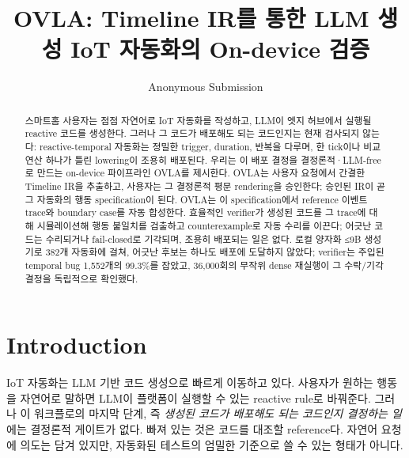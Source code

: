 \documentclass[sigconf,nonacm,anonymous,review]{acmart}
\title{OVLA: Timeline IR를 통한 LLM 생성 IoT 자동화의 On-device 검증}
\author{Anonymous Submission}
\affiliation{\institution{Submitted to SenSys 2027}\country{}}
\begin{document}
\begin{abstract}
스마트홈 사용자는 점점 자연어로 IoT 자동화를 작성하고, LLM이 엣지 허브에서 실행될 reactive 코드를 생성한다. 그러나 그 코드가 배포해도 되는 코드인지는 현재 검사되지 않는다: reactive-temporal 자동화는 정밀한 trigger, duration, 반복을 다루며, 한 tick이나 비교 연산 하나가 틀린 lowering이 조용히 배포된다. 우리는 이 배포 결정을 결정론적·LLM-free로 만드는 on-device 파이프라인 OVLA를 제시한다. OVLA는 사용자 요청에서 간결한 Timeline IR을 추출하고, 사용자는 그 결정론적 평문 rendering을 승인한다; 승인된 IR이 곧 그 자동화의 행동 specification이 된다. OVLA는 이 specification에서 reference 이벤트 trace와 boundary case를 자동 합성한다. 효율적인 verifier가 생성된 코드를 그 trace에 대해 시뮬레이션해 행동 불일치를 검출하고 counterexample로 자동 수리를 이끈다; 어긋난 코드는 수리되거나 fail-closed로 기각되며, 조용히 배포되는 일은 없다. 로컬 양자화 ≤9B 생성기로 382개 자동화에 걸쳐, 어긋난 후보는 하나도 배포에 도달하지 않았다; verifier는 주입된 temporal bug 1,552개의 99.3\%를 잡았고, 36,000회의 무작위 dense 재실행이 그 수락/기각 결정을 독립적으로 확인했다.
\end{abstract}


\maketitle

\section{Introduction}

IoT 자동화는 LLM 기반 코드 생성으로 빠르게 이동하고 있다. 사용자가 원하는 행동을 자연어로 말하면 LLM이 플랫폼이 실행할 수 있는 reactive rule로 바꿔준다. 그러나 이 워크플로의 마지막 단계, 즉 \emph{생성된 코드가 배포해도 되는 코드인지 결정하는 일}에는 결정론적 게이트가 없다. 빠져 있는 것은 코드를 대조할 reference다. 자연어 요청에 의도는 담겨 있지만, 자동화된 테스트의 엄밀한 기준으로 쓸 수 있는 형태가 아니다.
\end{document}

